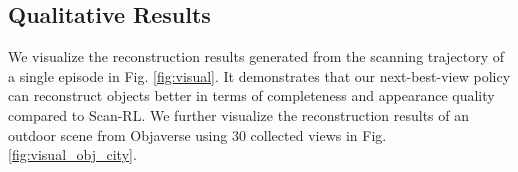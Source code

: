 


\subsection{Qualitative Results}
    We visualize the reconstruction results generated from the scanning trajectory of a single episode in Fig. \ref{fig:visual}. 
    It demonstrates that our next-best-view policy can reconstruct objects better in terms of completeness and appearance quality compared to Scan-RL.
    We further visualize the reconstruction results of an outdoor scene from Objaverse using 30 collected views in Fig. \ref{fig:visual_obj_city}. 
